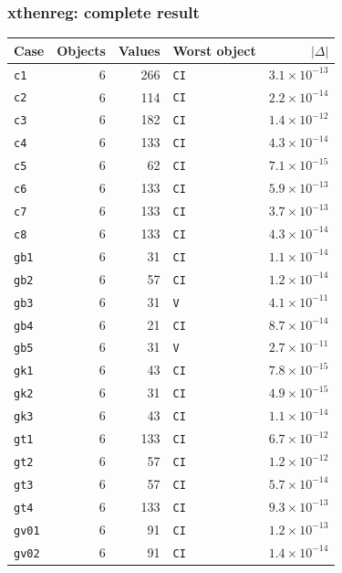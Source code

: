\subsubsection*{xthenreg: complete result}

\begin{longtable}{@{}p{3.6cm}rrp{4.9cm}r@{}}
\toprule
Case & Objects & Values & Worst object & $|\Delta|$ \\
\midrule
\endhead
\texttt{c1} & 6 & 266 & \texttt{CI} & $3.1\times10^{-13}$ \\
\texttt{c2} & 6 & 114 & \texttt{CI} & $2.2\times10^{-14}$ \\
\texttt{c3} & 6 & 182 & \texttt{CI} & $1.4\times10^{-12}$ \\
\texttt{c4} & 6 & 133 & \texttt{CI} & $4.3\times10^{-14}$ \\
\texttt{c5} & 6 & 62 & \texttt{CI} & $7.1\times10^{-15}$ \\
\texttt{c6} & 6 & 133 & \texttt{CI} & $5.9\times10^{-13}$ \\
\texttt{c7} & 6 & 133 & \texttt{CI} & $3.7\times10^{-13}$ \\
\texttt{c8} & 6 & 133 & \texttt{CI} & $4.3\times10^{-14}$ \\
\texttt{gb1} & 6 & 31 & \texttt{CI} & $1.1\times10^{-14}$ \\
\texttt{gb2} & 6 & 57 & \texttt{CI} & $1.2\times10^{-14}$ \\
\texttt{gb3} & 6 & 31 & \texttt{V} & $4.1\times10^{-11}$ \\
\texttt{gb4} & 6 & 21 & \texttt{CI} & $8.7\times10^{-14}$ \\
\texttt{gb5} & 6 & 31 & \texttt{V} & $2.7\times10^{-11}$ \\
\texttt{gk1} & 6 & 43 & \texttt{CI} & $7.8\times10^{-15}$ \\
\texttt{gk2} & 6 & 31 & \texttt{CI} & $4.9\times10^{-15}$ \\
\texttt{gk3} & 6 & 43 & \texttt{CI} & $1.1\times10^{-14}$ \\
\texttt{gt1} & 6 & 133 & \texttt{CI} & $6.7\times10^{-12}$ \\
\texttt{gt2} & 6 & 57 & \texttt{CI} & $1.2\times10^{-12}$ \\
\texttt{gt3} & 6 & 57 & \texttt{CI} & $5.7\times10^{-14}$ \\
\texttt{gt4} & 6 & 133 & \texttt{CI} & $9.3\times10^{-13}$ \\
\texttt{gv01} & 6 & 91 & \texttt{CI} & $1.2\times10^{-13}$ \\
\texttt{gv02} & 6 & 91 & \texttt{CI} & $1.4\times10^{-14}$ \\

\end{longtable}
